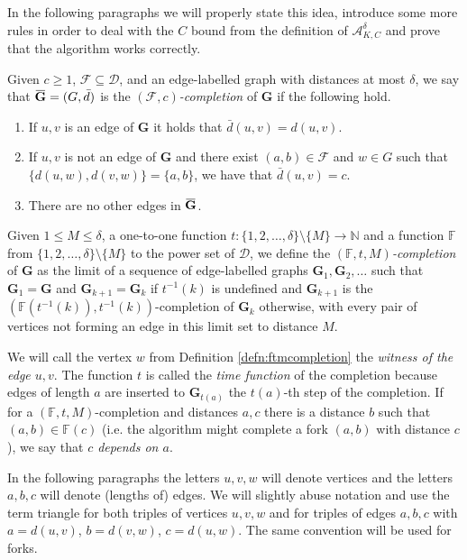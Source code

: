 \documentclass[11pt]{amsart}
\newcommand{\overbar}[1]{\mkern 1.5mu\overline{\mkern-1.5mu#1\mkern-1.5mu}\mkern 1.5mu}
\def\str#1{\mathbf {#1}}
\begin{document}
In the following paragraphs we will properly state this idea, introduce some more rules in order to deal with the $C$ bound from the definition of $\mathcal A^{\delta}_{K,C}$ and prove that the algorithm works correctly.

\begin{definition}\label{defn:ftmcompletion}
Given $c\geq 1$, $\mathcal F\subseteq \mathcal D$, and
an edge-labelled graph with distances at most $\delta$, we say that $\overbar{\str{G}}=(G,\bar{d})$ is the 
{\em $(\mathcal F,c)$-completion} of $\str{G}$ if the following hold.
\begin{enumerate}
\item If $u,v$ is an edge of $\str{G}$ it holds that $\bar{d}(u,v)=d(u,v)$.
\item If $u,v$ is not an edge of $\str{G}$ and there exist $(a,b)\in \mathcal F$ and $w\in G$ such that $\{d(u,w),d(v,w)\}=\{a,b\}$, we have that $\bar{d}(u,v)=c$.
\item There are no other edges in $\overbar{\str{G}}$.
\end{enumerate}

Given $1\leq M\leq \delta$, a one-to-one function $t\colon\{1,2,\ldots,\delta\}\setminus \{M\}\to \mathbb N$ 
and a function $\mathbb F$ from $\{1,2,\ldots,\delta\}\setminus \{M\}$ to the power set of $\mathcal D$, we define the {\em $(\mathbb F,t,M)$-completion} of  $\str{G}$
as the limit of a sequence of edge-labelled graphs  $\str{G}_1, \str{G}_2,\ldots$ such that $\str{G}_1=\str{G}$ and $\str{G}_{k+1}=\str{G}_k$ if $t^{-1}(k)$ is undefined
and $\str{G}_{k+1}$ is the $(\mathbb F(t^{-1}(k)),t^{-1}(k))$-completion of $\str{G}_{k}$ otherwise, with every pair of vertices not forming an edge in this limit set to distance $M$.
\end{definition}

We will call the vertex $w$ from Definition \ref{defn:ftmcompletion} the {\em witness of the edge $u,v$}. The function $t$ is called the {\em time function} of the completion because edges of length $a$ are inserted to $\str{G}_{t(a)}$ the $t(a)$-th step of the completion. If for a $(\mathbb F, t, M)$-completion and distances $a,c$ there is a distance $b$ such that $(a,b)\in \mathbb F(c)$ (i.e. the algorithm might complete a fork $(a,b)$ with distance $c$), we say that {\em $c$ depends on $a$}. 


In the following paragraphs the letters $u,v,w$ will denote vertices and the letters $a,b,c$ will denote (lengths of) edges. We will slightly abuse notation and use the term triangle for both triples of vertices $u,v,w$ and for triples of edges $a,b,c$ with $a = d(u,v)$, $b = d(v,w)$, $c = d(u,w)$. The same convention will be used for forks.
\end{document}
